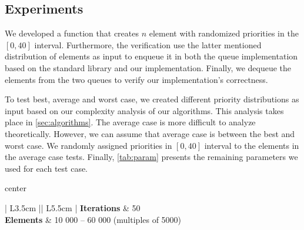 \documentclass[a4paper,11pt]{kth-mag}
\newcommand*{\skippara}{\par\vspace{\baselineskip} \noindent}
\begin{document}
\subsection{Experiments}
We developed a function that creates $n$ element with randomized priorities in the $[0,40]$ interval.
Furthermore, the verification use the latter mentioned distribution of elements as input to enqueue it in both the queue implementation based on the standard library and our implementation.
Finally, we dequeue the elements from the two queues to verify our implementation's correctness.

\skippara To test best, average and worst case, we created different priority distributions as input based on our complexity analysis of our algorithms.
This analysis takes place in \cref{sec:algorithms}.
The average case is more difficult to analyze theoretically.
However, we can assume that average case is between the best and worst case.
We randomly assigned priorities in $[0,40]$ interval to the elements in the average case tests.
Finally, \cref{tab:param} presents the remaining parameters we used for each test case.

\begin{table}
    \small
    \caption{Experiment parameters for each implementation and test case}
    \label{tab:param}
    \begin{adjustbox}{center}
        \renewcommand*\arraystretch{1.2}\begin{tabular}{| L{3.5cm} || L{5.5cm} |}
            \hline
            \textbf{Iterations} & 50
            \\ \hline
            \textbf{Elements} & 10 000 -- 60 000 (multiples of 5000)
            \\ \hline
        \end{tabular}
    \end{adjustbox}
\end{table}
\end{document}
